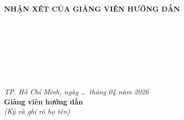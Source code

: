 \begin{titlepage}
\begin{center}
{\fontsize{12pt}{14pt}\selectfont \textbf{NHẬN XÉT CỦA GIẢNG VIÊN HƯỚNG DẪN}}
\end{center}
\vspace{2pt}
\noindent\makebox[\linewidth]{\rule{\linewidth}{0.5pt}}\\[4pt]
{\fontsize{12pt}{20pt}\selectfont
\dotfill\\
\dotfill\\
\dotfill\\
\dotfill\\
\dotfill\\
}

\begin{flushright}
{\fontsize{12pt}{14pt}\selectfont \textit{TP. Hồ Chí Minh, ngày \dots\ tháng 04 năm 2026}}\\[2pt]
{\fontsize{12pt}{14pt}\selectfont \textbf{Giảng viên hướng dẫn}}\\[2pt]
{\fontsize{11pt}{13pt}\selectfont \textit{(Ký và ghi rõ họ tên)}}
\end{flushright}

\end{titlepage}
